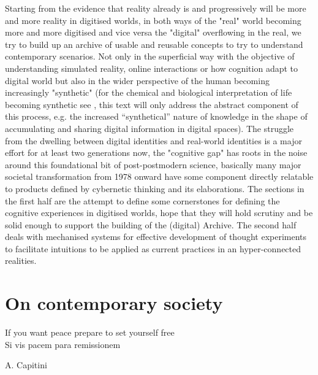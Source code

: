 \documentclass[14pt,a4paper]{extarticle}
\begin{document}
\hspace*{15mm}Starting from the evidence that reality already is and progressively will be more and more reality in digitised worlds, in both ways of the "real" world becoming more and more digitised and vice versa the "digital" overflowing in the real, we try to build up an archive of usable and reusable concepts to try to understand contemporary scenarios. Not only in the superficial way with the objective of understanding simulated reality, online interactions or how cognition adapt to digital world but also in the wider perspective of the human becoming increasingly "synthetic" (for the chemical  and biological interpretation of life becoming synthetic see \cite{benanti2018realt}, this text will only address the abstract component of this process, e.g. the increased “synthetical” nature of knowledge in the shape of accumulating and sharing digital information in digital spaces).
\newline
\hspace*{15mm}The struggle from the dwelling between digital identities and real-world identities is a major effort for at least two generations now, the "cognitive gap" has roots in the noise around this foundational bit of post-postmodern science, basically many major societal transformation from 1978 onward have some component directly relatable to products defined by cybernetic thinking and its elaborations. The sections in the first half are the attempt to define some cornerstones for defining the cognitive experiences in digitised worlds, hope that they will hold scrutiny and be solid enough to support the building of the (digital) Archive. The second half deals with mechanised systems for effective development of thought experiments to facilitate intuitions to be applied as current practices in an hyper-connected realities. 

\section*{On contemporary society}%
\label{sec:contemporary}%

\epigraph{
If you want peace prepare to set yourself free\\
\vspace{5mm}
Si vis pacem para remissionem}{A. Capitini}
\end{document}
